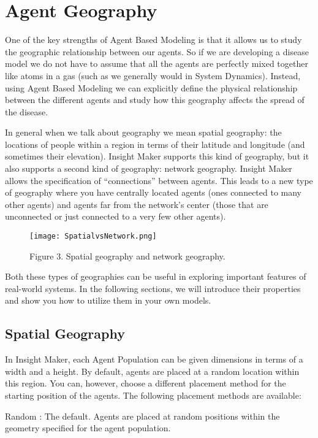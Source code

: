 \documentclass[]{memoir}
\let\Oldincludegraphics\includegraphics
\renewcommand{\includegraphics}[1]{\Oldincludegraphics[max size={\textwidth}{\textheight}]{#1}}
\begin{document}
\section{Agent Geography}

One of the key strengths of Agent Based Modeling is that it allows us to
study the geographic relationship between our agents. So if we are
developing a disease model we do not have to assume that all the agents
are perfectly mixed together like atoms in a gas (such as we generally
would in System Dynamics). Instead, using Agent Based Modeling we can
explicitly define the physical relationship between the different agents
and study how this geography affects the spread of the disease.

In general when we talk about geography we mean spatial geography: the
locations of people within a region in terms of their latitude and
longitude (and sometimes their elevation). Insight Maker supports this
kind of geography, but it also supports a second kind of geography:
network geography. Insight Maker allows the specification of
``connections'' between agents. This leads to a new type of geography
where you have centrally located agents (ones connected to many other
agents) and agents far from the network's center (those that are
unconnected or just connected to a very few other agents).

\begin{figure}[htbp]
\centering
\texttt{[image: SpatialvsNetwork.png]}
\caption{Figure 3. Spatial geography and network geography.}
\end{figure}

Both these types of geographies can be useful in exploring important
features of real-world systems. In the following sections, we will
introduce their properties and show you how to utilize them in your own
models.

\subsection{Spatial Geography}

In Insight Maker, each Agent Population can be given dimensions in terms
of a width and a height. By default, agents are placed at a random
location within this region. You can, however, choose a different
placement method for the starting position of the agents. The following
placement methods are available:

Random : The default. Agents are placed at random positions within the
geometry specified for the agent population.
\end{document}
